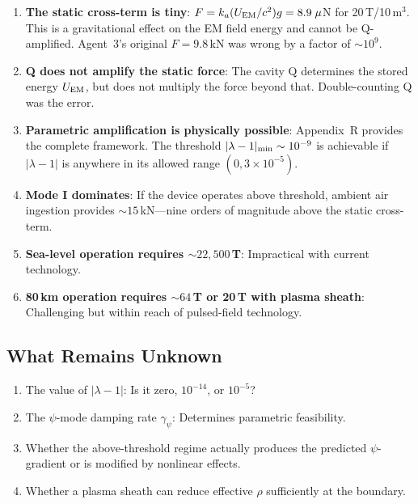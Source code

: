 \documentclass[12pt,letterpaper]{article}
\begin{document}
\begin{enumerate}
\item \textbf{The static cross-term is tiny}: $F = k_a (U_{\rm EM}/c^2)g = 8.9\;\mu$N for 20\,T/10\,m$^3$. This is a gravitational effect on the EM field energy and cannot be Q-amplified. Agent~3's original $F = 9.8$\,kN was wrong by a factor of $\sim 10^9$.

\item \textbf{Q does not amplify the static force}: The cavity Q determines the stored energy $U_{\rm EM}$, but does not multiply the force beyond that. Double-counting Q was the error.

\item \textbf{Parametric amplification is physically possible}: Appendix~R provides the complete framework. The threshold $|\lambda - 1|_{\rm min} \sim 10^{-9}$ is achievable if $|\lambda - 1|$ is anywhere in its allowed range $(0, 3 \times 10^{-5})$.

\item \textbf{Mode I dominates}: If the device operates above threshold, ambient air ingestion provides $\sim 15$\,kN---nine orders of magnitude above the static cross-term.

\item \textbf{Sea-level operation requires $\sim 22{,}500$\,T}: Impractical with current technology.

\item \textbf{80\,km operation requires $\sim 64$\,T or 20\,T with plasma sheath}: Challenging but within reach of pulsed-field technology.
\end{enumerate}

\subsection{What Remains Unknown}

\begin{enumerate}
\item The value of $|\lambda - 1|$: Is it zero, $10^{-14}$, or $10^{-5}$?
\item The $\psi$-mode damping rate $\gamma_\psi$: Determines parametric feasibility.
\item Whether the above-threshold regime actually produces the predicted $\psi$-gradient or is modified by nonlinear effects.
\item Whether a plasma sheath can reduce effective $\rho$ sufficiently at the boundary.
\end{enumerate}
\end{document}
